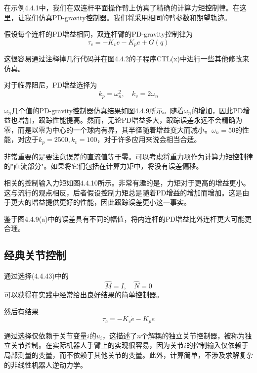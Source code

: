 \documentclass[UTF8]{ctexart}
\theoremstyle{definition}
\begin{document}
\begin{examplebox}[示例4.4-3：PD-Gravity控制器的仿真]
在示例4.4.1中，我们在双连杆平面操作臂上仿真了精确的计算力矩控制律。在这里，让我们仿真PD-gravity控制器。我们将采用相同的臂参数和期望轨迹。

假设每个连杆的PD增益相同，双连杆臂的PD-gravity控制律为
\begin{equation}
    \tau_c = -K_v\dot{e} - K_pe + G(q)
\end{equation}

这很容易通过注释掉几行代码并在图4.4.2的子程序CTL(x)中进行一些其他修改来仿真。

对于临界阻尼，PD增益选择为
\begin{equation}
    k_p = \omega_n^2, \quad k_v = 2\omega_n
\end{equation}

$\omega_n$几个值的PD-gravity控制器仿真结果如图4.4.9所示。随着$\omega_n$的增加，因此PD增益也增加，跟踪性能提高。然而，无论PD增益多大，跟踪误差永远不会精确为零，而是以零为中心的一个球内有界，其半径随着增益变大而减小。$\omega_n = 50$的性能，对应于$k_p = 2500, k_v = 100$，对于许多应用来说会相当合适。

非常重要的是要注意误差的直流值等于零。可以考虑将重力项作为计算力矩控制律的"直流部分"。如果将它们包括在计算力矩中，将没有误差偏移。

相关的控制输入力矩如图4.4.10所示。非常有趣的是，力矩对于更高的增益更小。这与流行的观点相反，后者假设控制力矩总是随着PD增益的增加而增加。这是由于更大的增益提供更好的性能，因此跟踪误差更小这一事实。

鉴于图4.4.9(a)中的误差具有不同的幅值，将内连杆的PD增益比外连杆更大可能更合理。
\end{examplebox}

\subsection{经典关节控制}

通过选择(4.4.43)中的
\begin{equation}
    \hat{M} = I, \quad \hat{N} = 0
\end{equation}
可以获得在实践中经常给出良好结果的简单控制器。

然后有结果
\begin{equation}
    \tau_c = -K_v\dot{e} - K_pe
\end{equation}

通过选择仅依赖于关节变量$i$的$u_i$，这描述了$n$个解耦的独立关节控制器，被称为独立关节控制。在实际机器人手臂上的实现很容易，因为关节$i$的控制输入仅依赖于局部测量的变量，而不依赖于其他关节的变量。此外，计算简单，不涉及求解复杂的非线性机器人逆动力学。
\end{document}
